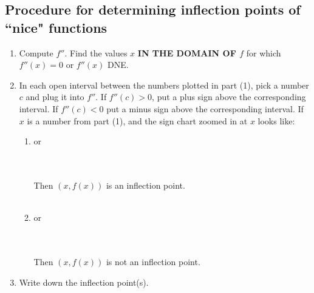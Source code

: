 \documentclass[reqno,psamsfonts]{amsart}
\theoremstyle{definition}
\theoremstyle{remark}
\numberwithin{equation}{section}
\begin{document}
\subsection*{Procedure for determining inflection points of ``nice" functions}
\begin{enumerate}
\item Compute $f''$. Find the values $x$ \textbf{IN THE DOMAIN OF $f$} for which $f''(x) = 0$ or $f''(x)$ DNE.
\\
\item In each open interval between the numbers plotted in part (1), pick a number $c$ and plug it into $f''$. If $f''(c)>0$, put a plus sign above the corresponding interval. If $f''(c)<0$ put a minus sign above the corresponding interval. If $x$ is a number from part (1), and the sign chart zoomed in at $x$ looks like:
\\
\begin{enumerate}
\item \hspace{2em}
\hspace{2em} or\hspace{2em}
\\
\\Then $(x,f(x))$ is an inflection point.
\\
\\
\item \hspace{2em}
\hspace{2em} or\hspace{2em}
\\
\\Then $(x, f(x))$ is not an inflection point.
\\
\end{enumerate}
\item Write down the inflection point(s). 
\end{enumerate}
\end{document}
